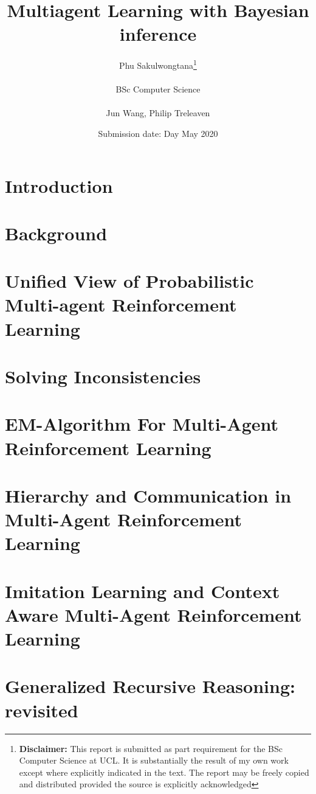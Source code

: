 \documentclass{report}
\title{{{\Huge Multiagent Learning with Bayesian inference}}\\
}
\date{Submission date: Day May 2020}
\author{Phu Sakulwongtana\thanks{
{\bf Disclaimer:}
This report is submitted as part requirement for the BSc Computer Science at UCL. It is
substantially the result of my own work except where explicitly indicated in the text.
The report may be freely copied and distributed provided the source is explicitly acknowledged
}
\\ \\
BSc Computer Science\\ \\
Jun Wang, Philip Treleaven}
\begin{document}
 
\onehalfspacing
\maketitle

\begin{abstract}

\end{abstract}

\tableofcontents



\setcounter{page}{1}

\chapter{Introduction}


\chapter{Background}

\chapter{Unified View of Probabilistic Multi-agent Reinforcement Learning}

\chapter{Solving Inconsistencies}

\chapter{EM-Algorithm For Multi-Agent Reinforcement Learning}

\chapter{Hierarchy and Communication in Multi-Agent Reinforcement Learning}

\chapter{Imitation Learning and Context Aware Multi-Agent Reinforcement Learning}

\chapter{Generalized Recursive Reasoning: revisited}
\end{document}
